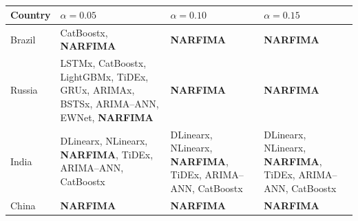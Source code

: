 \begin{table}[!htbp]
\fontsize{7}{8}\selectfont
\caption{}
\centering
\begin{tabular}{@{}l>{\raggedright\arraybackslash}p{4.5cm}>{\raggedright\arraybackslash}p{4.5cm}>{\raggedright\arraybackslash}p{4.5cm}@{}}
\hline
Country & $\alpha = 0.05$ & $\alpha = 0.10$ & $\alpha = 0.15$ \\ \hline
Brazil & CatBoostx, \textbf{NARFIMA} & \textbf{NARFIMA} & \textbf{NARFIMA} \\
Russia & LSTMx, CatBoostx, LightGBMx, TiDEx, GRUx, ARIMAx, BSTSx, ARIMA--ANN, EWNet, \textbf{NARFIMA} & \textbf{NARFIMA} & \textbf{NARFIMA} \\
India & DLinearx, NLinearx, \textbf{NARFIMA}, TiDEx, ARIMA--ANN, CatBoostx & DLinearx, NLinearx, \textbf{NARFIMA}, TiDEx, ARIMA--ANN, CatBoostx & DLinearx, NLinearx, \textbf{NARFIMA}, TiDEx, ARIMA--ANN, CatBoostx \\
China & \textbf{NARFIMA} & \textbf{NARFIMA} & \textbf{NARFIMA} \\
\hline
\end{tabular}
\label{tab:MCS_extended}
\end{table}
